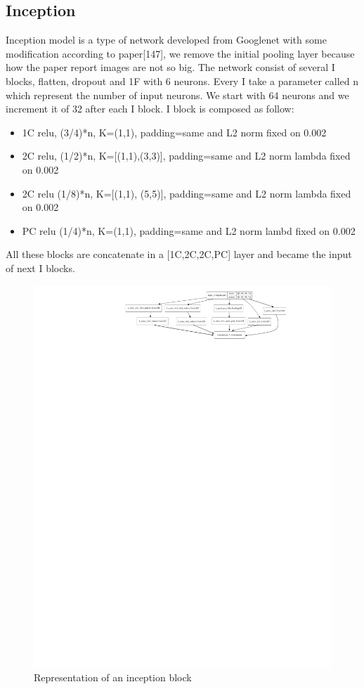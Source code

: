 \documentclass[10pt,twocolumn,letterpaper]{article}
\begin{document}
\subsection*{Inception}
Inception model is a type of network developed from Googlenet \cite{13} with some modification according to paper[147], we remove the initial pooling layer because how the paper report \cite{147} images are not so big. 
The network consist of several I blocks, flatten, dropout and 1F with 6 neurons. Every I take a parameter called n which represent the number of input neurons. 
We start with 64 neurons and we increment it of 32 after each I block. I block is composed as follow:
\begin{itemize}[noitemsep]%
\item 1C relu, (3/4)*n, K=(1,1), padding=same and L2 norm fixed on 0.002
\item 2C relu, (1/2)*n, K=[(1,1),(3,3)], padding=same and L2 norm lambda fixed on 0.002
\item 2C relu (1/8)*n, K=[(1,1), (5,5)], padding=same and L2 norm lambda fixed on 0.002
\item PC relu (1/4)*n, K=(1,1), padding=same and L2 norm lambd fixed on 0.002
\end{itemize}
All these blocks are concatenate in a [1C,2C,2C,PC] layer and became the input of next I blocks.
\begin{figure}[h]
   \includegraphics[width=1\linewidth]{./immagini/m_inception_v0.pdf}
   \caption{Representation of an inception block}
\end{figure}
\end{document}
